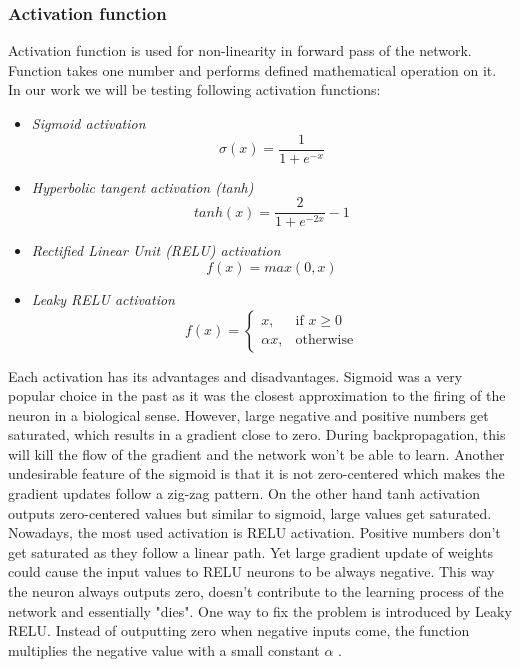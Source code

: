 \subsubsection{Activation function}

Activation function is used for non-linearity in forward pass of the network. Function takes one number and performs defined mathematical operation on it. In our work we will be testing following activation functions:
\begin{itemize}
    \item \textit{Sigmoid activation}
        \begin{equation}
            \sigma (x) = \frac{1}{1 + e^{-x}}
        \end{equation}
        
    \item \textit{Hyperbolic tangent activation (tanh)}
        \begin{equation}
            tanh(x) = \frac{2}{1+e^{-2x}} - 1
        \end{equation}
    
    \item \textit{Rectified Linear Unit (RELU) activation}
        \begin{equation}
            f(x) = max(0,x)
        \end{equation}
        
    \item \textit{Leaky RELU activation}
        \begin{equation}
            f(x) = 
            \begin{cases}
                x,& \text{if } x\geq 0\\
                \alpha x ,& \text{otherwise}
            \end{cases}
        \end{equation}
\end{itemize}

Each activation has its advantages and disadvantages. Sigmoid was a very popular choice in the past as it was the closest approximation to the firing of the neuron in a biological sense. However, large negative and positive numbers get saturated, which results in a gradient close to zero. During backpropagation, this will kill the flow of the gradient and the network won't be able to learn. Another undesirable feature of the sigmoid is that it is not zero-centered which makes the gradient updates follow a zig-zag pattern. On the other hand tanh activation outputs zero-centered values but similar to sigmoid, large values get saturated. Nowadays, the most used activation is RELU activation. Positive numbers don't get saturated as they follow a linear path. Yet large gradient update of weights could cause the input values to RELU neurons to be always negative. This way the neuron always outputs zero, doesn't contribute to the learning process of the network and essentially "dies". One way to fix the problem is introduced by Leaky RELU. Instead of outputting zero when negative inputs come, the function multiplies the negative value with a small constant $\alpha$ \cite{standford}.
